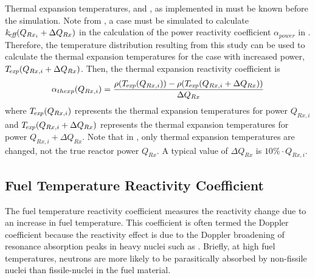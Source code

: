     Thermal expansion temperatures, \texpfuel and \texpstruct, as implemented in 
     must be known before the simulation. Note from
    , a case must be simulated to
    calculate $k_{\!\mbox{\scriptsize \em eff}}(Q_{Rx_i} + \Delta Q_{Rx})$ in the calculation of the power
    reactivity coefficient $\alpha_{power}$ in 
    . Therefore, the temperature
    distribution resulting from this study can be used to calculate the thermal
    expansion temperatures for the case with increased power, 
    ${{T_{\!\mbox{\scriptsize \em exp}}}(Q_{Rx,i} + \Delta Q_{Rx})}$.
    Then, the thermal expansion reactivity coefficient is 
    \begin{equation}
      \label{eq:thermal_expansion_reactivity_coefficient}
      \alpha_{thexp}(Q_{Rx,i}) = \frac{\rho({T_{\!\mbox{\scriptsize \em exp}}}(Q_{Rx,i})) - 
        \rho({T_{\!\mbox{\scriptsize \em exp}}}(Q_{Rx,i} + \Delta Q_{Rx}))}
        {\Delta Q_{Rx}}
    \end{equation}
    where ${T_{\!\mbox{\scriptsize \em exp}}}(Q_{Rx,i})$ represents the thermal expansion temperatures for
    power $Q_{Rx,i}$ and ${T_{\!\mbox{\scriptsize \em exp}}}(Q_{Rx,i} + \Delta Q_{Rx})$ represents the
    thermal expansion temperatures for power $Q_{Rx,i} + \Delta Q_{Rx}$. Note
    that in , only thermal
    expansion temperatures are changed, not the true reactor power $Q_{Rx}$.
    A typical value of $\Delta Q_{Rx}$ is $10\% \cdot Q_{Rx,i}$.

  \subsection{Fuel Temperature Reactivity Coefficient}
  \label{sec:fuel_temperature_reactivity_coefficient}
    The fuel temperature reactivity coefficient measures the reactivity change 
    due to an increase in fuel temperature. This coefficient is often termed the
    Doppler coefficient because the reactivity effect is due to the Doppler
    broadening of resonance absorption peaks in heavy nuclei such as
     \cite{textbookknief}. Briefly, at high fuel temperatures, 
    neutrons are more likely to be parasitically absorbed by non-fissile nuclei
    than fissile-nuclei in the fuel material.

